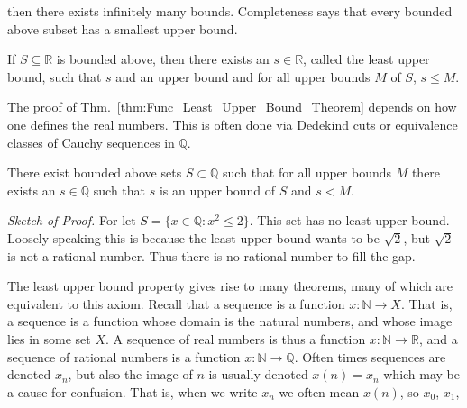             then there exists infinitely many bounds.
            Completeness says that every bounded above subset
            has a smallest upper bound.
            \begin{theorem}
                \label{thm:Func_Least_Upper_Bound_Theorem}
                If $S\subseteq{\mathbb{R}}$ is bounded above,
                then there exists an $s\in\mathbb{R}$,
                called the least upper bound, such that $s$
                and an upper bound and for all upper bounds
                $M$ of $S$, $s\leq{M}$.
            \end{theorem}
            The proof of
            Thm.~\ref{thm:Func_Least_Upper_Bound_Theorem}
            depends on how one defines the real numbers. This is
            often done via Dedekind cuts or equivalence
            classes of Cauchy sequences in $\mathbb{Q}$.
            \begin{theorem}
                There exist bounded above sets
                $S\subset\mathbb{Q}$ such that for all
                upper bounds $M$ there exists an
                $s\in\mathbb{Q}$ such that $s$ is an upper
                bound of $S$ and $s<M$.
            \end{theorem}
            \textit{Sketch of Proof.}
            For let $S=\{x\in\mathbb{Q}:x^{2}\leq{2}\}$.
            This set has no least upper bound. Loosely
            speaking this is because the
            least upper bound wants to be $\sqrt{2}$,
            but $\sqrt{2}$ is not a rational number. Thus
            there is no rational number to fill the gap.
            \par\hfill\par
            The least upper bound property gives rise
            to many theorems, many of which are equivalent
            to this axiom. Recall that a sequence is a
            function $x:\mathbb{N}\rightarrow{X}$. That is,
            a sequence is a function whose domain is the
            natural numbers, and whose image lies in some
            set $X$. A sequence of real numbers is thus a
            function $x:\mathbb{N}\rightarrow\mathbb{R}$,
            and a sequence of rational numbers is a function
            $x:\mathbb{N}\rightarrow\mathbb{Q}$.
            Often times sequences are denoted $x_{n}$,
            but also the image of $n$ is usually
            denoted $x(n)=x_{n}$ which may be a cause
            for confusion. That is, when we write $x_{n}$
            we often mean $x(n)$, so $x_{0}$, $x_{1}$,
